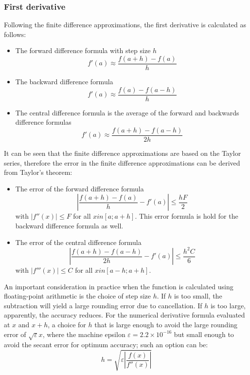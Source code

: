\subsubsection{First derivative}
Following the finite difference approximations, the first derivative is calculated as follows:
\begin{itemize}
	\setlength\itemsep{0em}
	\item The forward difference formula with step size $h$
	\begin{equation}
		f'(a) \approx \frac{f(a+h) - f(a)}{h}
	\end{equation}
	\item The backward difference formula
	\begin{equation}
		f'(a) \approx \frac{f(a) - f(a-h)}{h}
	\end{equation}
	\item The central difference formula is the average of the forward and backwards difference formulas
	\begin{equation}
		f'(a) \approx \frac{f(a+h) - f(a-h)}{2h}
	\end{equation}
\end{itemize}
It can be seen that the finite difference approximations are based on the Taylor series, therefore the error in the finite difference approximations can be derived from Taylor's theorem:
\begin{itemize}
	\setlength\itemsep{0em}
	\item The error of the forward difference formula
	\begin{equation}
		\left| \frac{f(a+h) - f(a)}{h} - f'(a) \right| \leq \frac{h F}{2}
	\end{equation}
	with $|f''(x)| \leq F$ for all $x in [a;a+h]$. This error formula is hold for the backward difference formula as well.
	\item The error of the central difference formula
	\begin{equation}
		\left| \frac{f(a+h) - f(a-h)}{2h} - f'(a) \right| \leq \frac{h^2 C}{6}
	\end{equation}
	with $|f'''(x)| \leq C$ for all $x in [a-h;a+h]$.
\end{itemize}
An important consideration in practice when the function is calculated using floating-point arithmetic is the choice of step size $h$. If $h$ is too small, the subtraction will yield a large rounding error due to cancellation. If $h$ is too large, apparently, the accuracy reduces. For the numerical derivative formula evaluated at $x$ and $x + h$, a choice for $h$ that is large enough to avoid the large rounding error of $\sqrt{\varepsilon}x$, where the machine epsilon $\varepsilon = 2.2 \times 10^{-16}$ but small enough to avoid the secant error for optimum accuracy; such an option can be:
\begin{equation}
	h = \sqrt{\varepsilon \left| \frac{f(x)}{f''(x)} \right|}
\end{equation}

